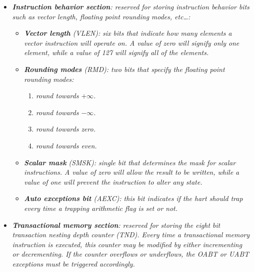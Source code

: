             \begin{itemize}

                \item \textit{\textbf{Instruction behavior section}: reserved for storing instruction behavior bits such as vector length, floating point rounding modes, etc\ldots:}

                    \begin{itemize}

                        \item \textit{\textbf{Vector length} (VLEN): six bits that indicate how many elements a vector instruction will operate on. A value of zero will signify only one element, while a value of 127 will signify all of the elements.}

                        \item \textit{\textbf{Rounding modes} (RMD): two bits that specify the floating point rounding modes:}

                            \begin{enumerate}

                                \item \textit{round towards \(+\infty\).}
                                \item \textit{round towards \(-\infty\).}
                                \item \textit{round towards zero.}
                                \item \textit{round towards even.}

                            \end{enumerate}

                        \item \textit{\textbf{Scalar mask} (SMSK): single bit that determines the mask for scalar instructions. A value of zero will allow the result to be written, while a value of one will prevent the instruction to alter any state.}

                        \item \textit{\textbf{Auto exceptions bit} (AEXC): this bit indicates if the hart should trap every time a trapping arithmetic flag is set or not.}

                    \end{itemize}

                \item \textit{\textbf{Transactional memory section}: reserved for storing the eight bit transaction nesting depth counter (TND). Every time a transactional memory instruction is executed, this counter may be modified by either incrementing or decrementing. If the counter overflows or underflows, the OABT or UABT exceptions must be triggered accordingly.}


\end{itemize}
